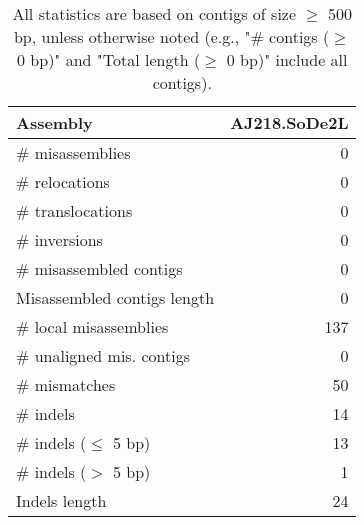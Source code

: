 \documentclass[12pt,a4paper]{article}
\begin{document}
\begin{table}[ht]
\begin{center}
\caption{All statistics are based on contigs of size $\geq$ 500 bp, unless otherwise noted (e.g., "\# contigs ($\geq$ 0 bp)" and "Total length ($\geq$ 0 bp)" include all contigs).}
\begin{tabular}{|l*{1}{|r}|}
\hline
Assembly & AJ218.SoDe2L \\ \hline
\# misassemblies & 0 \\ \hline
\hspace{5mm}\# relocations & 0 \\ \hline
\hspace{5mm}\# translocations & 0 \\ \hline
\hspace{5mm}\# inversions & 0 \\ \hline
\# misassembled contigs & 0 \\ \hline
Misassembled contigs length & 0 \\ \hline
\# local misassemblies & 137 \\ \hline
\# unaligned mis. contigs & 0 \\ \hline
\# mismatches & 50 \\ \hline
\# indels & 14 \\ \hline
\hspace{5mm}\# indels ($\leq$ 5 bp) & 13 \\ \hline
\hspace{5mm}\# indels ($>$ 5 bp) & 1 \\ \hline
Indels length & 24 \\ \hline
\end{tabular}
\end{center}
\end{table}
\end{document}

